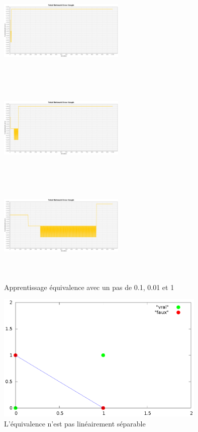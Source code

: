 \documentclass[twoside,openright,a4paper,11pt,french]{article}
\begin{document}
\begin{figure}[ht]
\centering
\includegraphics[width=6cm,height=5cm]{./pics/eq/mono_eq_0.1.eps}
\includegraphics[width=6cm,height=5cm]{./pics/eq/mono_eq_0.01.eps}
\includegraphics[width=6cm,height=5cm]{./pics/eq/mono_eq_0.001.eps}
\caption{Apprentissage équivalence avec un pas de 0.1, 0.01 et 1}
\label{fig:eqmono010010001}
\end{figure}

\begin{figure}[ht]
\centering
\includegraphics[width=10cm]{./pics/eqnonlin/eqlinsep.eps}
\caption{L'équivalence n'est pas linéairement séparable}
\label{fig:eqnlin}
\end{figure}
\end{document}

